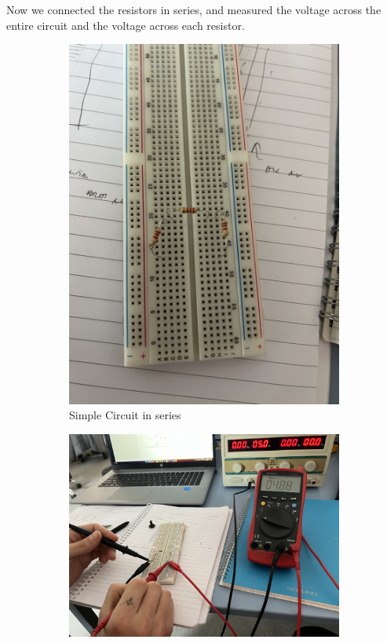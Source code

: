 \documentclass[a4paper, 10pt]{article}
\begin{document}
					Now we connected the resistors in series, and measured the voltage across the entire circuit and the voltage across each resistor.
					\begin{figure}[h]
						\centering
							\begin{subfigure}[h]{0.25\textwidth}
								\includegraphics[width=\textwidth]{./images/SimpleCircuitInSeries.jpeg}
								\caption{Simple Circuit in series}
								\label{sub-fig:SimpleCircuitInSeries}
							\end{subfigure}
							\hspace{0.5cm} %
							\begin{subfigure}[h]{0.65\textwidth}
								\includegraphics[width=\textwidth]{./images/MeasuringVoltageOfACircuit.jpeg}

\end{subfigure}
\end{figure}
\end{document}

